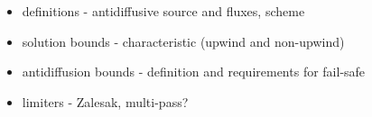 \begin{itemize}
  \item definitions - antidiffusive source and fluxes, scheme
  \item solution bounds - characteristic (upwind and non-upwind)
  \item antidiffusion bounds - definition and requirements for fail-safe
  \item limiters - Zalesak, multi-pass?
\end{itemize}
